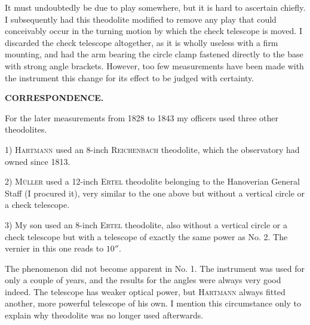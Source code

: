 \par\noindent\hspace*{\parindent}It must undoubtedly be due to play somewhere, but it is hard to ascertain  chiefly. I subsequently had this theodolite modified to remove any play that could conceivably occur in the turning motion by which the check telescope is moved. I discarded the check telescope altogether, as it is wholly useless with a firm mounting, and had the arm bearing the circle clamp fastened directly to the base with strong angle brackets. However, too few measurements have been made with the instrument  this change for its effect to be judged with certainty.

\par\clearpage
\noindent{}\hfill{\small\textbf{CORRESPONDENCE.}}\hfill\null\par\medskip
\par\noindent\hspace*{\parindent}For the later measurements from 1828 to 1843 my officers used three other theodolites.
\par\noindent\hspace*{\parindent}1) \textsc{Hartmann} used an 8-inch \textsc{Reichenbach} theodolite, which the observatory had owned since 1813.
\par\noindent\hspace*{\parindent}2) \textsc{Müller} used a 12-inch \textsc{Ertel} theodolite belonging to the Hanoverian General Staff (I procured it), very similar to the one above but without a vertical circle or a check telescope.
\par\noindent\hspace*{\parindent}3) My son used an 8-inch \textsc{Ertel} theodolite, also without a vertical circle or a check telescope but with a telescope of exactly the same power as No. 2. The vernier in this one reads to $10''$.

\par\noindent\hspace*{\parindent}The phenomenon did not become apparent in No. 1. The instrument was used for only a couple of years, and the results for the angles were always very good indeed. The telescope has weaker optical power, but \textsc{Hartmann} always fitted another, more powerful telescope of his own. I mention this circumstance only to explain why  theodolite was no longer used afterwards.

